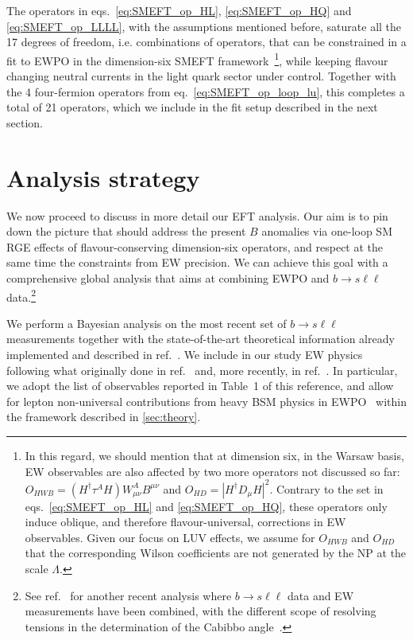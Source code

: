 The operators in eqs.~\eqref{eq:SMEFT_op_HL}, \eqref{eq:SMEFT_op_HQ} and \eqref{eq:SMEFT_op_LLLL}, with the assumptions mentioned before, saturate all the 17 degrees of freedom, i.e. combinations of operators, that can be constrained in a fit to EWPO in the dimension-six SMEFT framework~\footnote{In this regard, we should mention that at dimension six, in the Warsaw basis, EW observables are also affected by two more operators not discussed so far: ${ O}_{HWB}=(H^\dagger \tau^A H) W_{\mu\nu}^A B^{\mu\nu}$ and ${ O}_{HD}=\left|H^\dagger D_\mu H\right|^2$. Contrary to the set in eqs.~\eqref{eq:SMEFT_op_HL} and \eqref{eq:SMEFT_op_HQ}, these operators only induce oblique, and therefore flavour-universal, corrections in EW observables. Given our focus on LUV effects, we assume for ${O}_{HWB}$ and ${O}_{HD}$ that the corresponding Wilson coefficients are not generated by the NP at the scale $\Lambda$.}, while keeping flavour changing neutral currents in the light quark sector under control. Together with the 4 four-fermion operators from eq.~\eqref{eq:SMEFT_op_loop_lu}, this completes a total of 21 operators, which we include in the fit setup described in the next section. 

\section{Analysis strategy}
\label{sec:strategy}
We now proceed to discuss in more detail our EFT analysis. {Our aim is to pin down the picture that should address the present $B$ anomalies via one-loop SM RGE effects of flavour-conserving dimension-six operators, and respect at the same time the constraints from EW precision.} We can achieve this goal with a comprehensive global analysis that aims at combining EWPO and $b \to s \ell \ell$ data.\footnote{See ref.~\cite{Capdevila:2020rrl} for another recent analysis where $b \to s \ell \ell$ data and EW measurements have been combined, with the different scope of resolving tensions in the determination of the Cabibbo angle~\cite{Belfatto:2019swo,Grossman:2019bzp}.}

We perform a Bayesian analysis on the most recent set of $b \to s \ell \ell$ measurements together with the state-of-the-art theoretical information already implemented and described in ref.~\cite{Ciuchini:2019usw}. We include in our study EW physics following what originally done in ref.~\cite{Ciuchini:2013pca} and, more recently, in ref.~\cite{deBlas:2016ojx}. In particular, we adopt the list of observables reported in Table~1 of this reference, and allow for lepton non-universal contributions from heavy BSM physics in EWPO~\cite{Efrati:2015eaa,deBlas:2019wgy} within the framework described in \autoref{sec:theory}.

